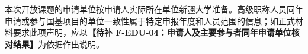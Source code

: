 \justifying
\NSFCBodyText

本次开放课题的申请单位按申请人实际所在单位新疆大学准备。高级职称人员同年申请或参与国基项目的单位一致性属于特定申报年度和人员范围的信息；如正式材料要求此项声明，应以\textbf{【待补 F-EDU-04：申请人及主要参与者同年申请单位核对结果】}为依据作出说明。
